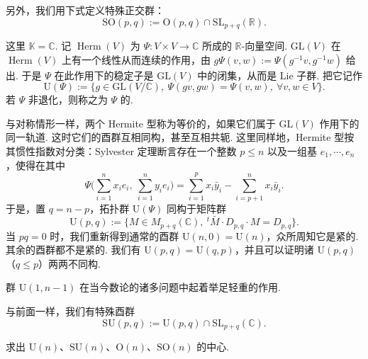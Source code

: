 另外，我们用下式定义特殊正交群：
\[
\mathrm{SO}(p,q):=\mathrm{O}(p,q)\cap\mathrm{SL}_{p+q}(\mathbb{R}).
\]
\begin{numpara}[酉群]\label{np:ssl-1-2-10}
这里 $\mathbb{K}=\mathbb{C}$. 记 $\operatorname{Herm}(V)$ 为 $\Psi\colon V\times V\longrightarrow\mathbb{C}$ 所成的 $\mathbb{R}$-向量空间. $\mathrm{GL}(V)$ 在 $\operatorname{Herm}(V)$ 上有一个线性从而连续的作用，由 $g\Psi(v,w):=\Psi(g^{-1}v,g^{-1}w)$ 给出. 于是 $\Psi$ 在此作用下的稳定子是 $\mathrm{GL}(V)$ 中的闭集，从而是 Lie 子群. 把它记作
\[
\mathrm{U}(\Psi):=\{g\in\mathrm{GL}(V/\mathbb{C}),\ \Psi(gv,gw)=\Psi(v,w),\ \forall v,w\in V\}.
\]
若 $\Psi$ 非退化，则称之为 $\Psi$ 的.

与对称情形一样，两个 Hermite 型称为等价的，如果它们属于 $\mathrm{GL}(V)$ 作用下的同一轨道. 这时它们的酉群互相同构，甚至互相共轭. 这里同样地，Hermite 型按其惯性指数对分类：Sylvester 定理断言存在一个整数 $p\leqslant n$ 以及一组基 $e_1,\cdots,e_n$，使得在其中
\[
\Psi\Big(\sum_{i=1}^{n}x_i e_i,\ \sum_{i=1}^{n}y_i e_i\Big)=\sum_{i=1}^{p}x_i\bar y_i-\sum_{i=p+1}^{n}x_i\bar y_i.
\]
于是，置 $q=n-p$，拓扑群 $\mathrm{U}(\Psi)$ 同构于矩阵群
\[
\mathrm{U}(p,q):=\{M\in M_{p+q}(\mathbb{C}),\ {}^{t}\bar M\cdot D_{p,q}\cdot M=D_{p,q}\}.
\]
当 $pq=0$ 时，我们重新得到通常的酉群 $\mathrm{U}(n,0)=\mathrm{U}(n)$，众所周知它是紧的. 其余的酉群都不是紧的. 我们有 $\mathrm{U}(p,q)=\mathrm{U}(q,p)$，并且可以证明诸 $\mathrm{U}(p,q)$（$q\leqslant p$）两两不同构.
\end{numpara}

\begin{remark*}
群 $\mathrm{U}(1,n-1)$ 在当今数论的诸多问题中起着举足轻重的作用.
\end{remark*}

与前面一样，我们有特殊酉群
\[
\mathrm{SU}(p,q):=\mathrm{U}(p,q)\cap\mathrm{SL}_{p+q}(\mathbb{C}).
\]
\begin{exercise*}
求出 $\mathrm{U}(n)$、$\mathrm{SU}(n)$、$\mathrm{O}(n)$、$\mathrm{SO}(n)$ 的中心.
\end{exercise*}

